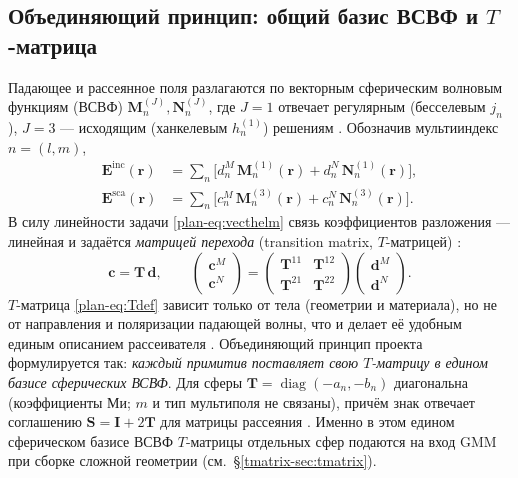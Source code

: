 \documentclass[11pt,a4paper]{article}
\begin{document}
\subsection{Объединяющий принцип: общий базис ВСВФ и \texorpdfstring{$T$}{T}-матрица}
\label{plan-ssec:tmatrix}

Падающее и рассеянное поля разлагаются по векторным сферическим волновым функциям (ВСВФ) $\bm{M}_{n}^{(J)},\bm{N}_{n}^{(J)}$, где $J=1$ отвечает регулярным (бесселевым $j_n$), $J=3$ --- исходящим (ханкелевым $h_n^{(1)}$) решениям \cite{stratton1941,mishchenko2002}. Обозначив мультииндекс $n=(l,m)$,
\begin{align}
\bm{E}^{\mathrm{inc}}(\bm{r}) &=\sum_{n}\Big[d_n^{M}\,\bm{M}_n^{(1)}(\bm{r})+d_n^{N}\,\bm{N}_n^{(1)}(\bm{r})\Big],
\label{plan-eq:incexp}\\
\bm{E}^{\mathrm{sca}}(\bm{r}) &=\sum_{n}\Big[c_n^{M}\,\bm{M}_n^{(3)}(\bm{r})+c_n^{N}\,\bm{N}_n^{(3)}(\bm{r})\Big].
\label{plan-eq:scaexp}
\end{align}
В силу линейности задачи \eqref{plan-eq:vecthelm} связь коэффициентов разложения --- линейная и задаётся \emph{матрицей перехода} (transition matrix, $T$-матрицей) \cite{waterman1971}:
\begin{equation}
\bm{c}=\bm{T}\,\bm{d},
\qquad
\begin{pmatrix}\bm{c}^{M}\\[2pt]\bm{c}^{N}\end{pmatrix}
=\begin{pmatrix}\bm{T}^{11}&\bm{T}^{12}\\[2pt]\bm{T}^{21}&\bm{T}^{22}\end{pmatrix}
\begin{pmatrix}\bm{d}^{M}\\[2pt]\bm{d}^{N}\end{pmatrix}.
\label{plan-eq:Tdef}
\end{equation}
$T$-матрица \eqref{plan-eq:Tdef} зависит только от тела (геометрии и материала), но не от направления и поляризации падающей волны, что и делает её удобным единым описанием рассеивателя \cite{waterman1971,mishchenko2002}. Объединяющий принцип проекта формулируется так: \emph{каждый примитив поставляет свою $T$-матрицу в едином базисе сферических ВСВФ}. Для сферы $\bm{T}=\operatorname{diag}(-a_n,-b_n)$ диагональна (коэффициенты Ми; $m$ и тип мультиполя не связаны), причём знак отвечает соглашению $\bm{S}=\bm{I}+2\bm{T}$ для матрицы рассеяния \cite{waterman1971,bohren1983}. Именно в этом едином сферическом базисе ВСВФ $T$-матрицы отдельных сфер подаются на вход GMM при сборке сложной геометрии (см.~\S\ref{tmatrix-sec:tmatrix}).
\end{document}
